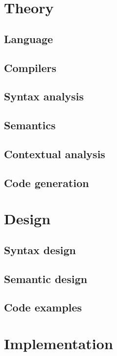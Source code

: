 \renewcommand{\ind}[1]{}
\chapter{Theory}
	\section{Language}
	\ind{sprogParadigmer}
	\section{Compilers}
	
	\section{Syntax analysis}
	\ind{grammartypes}
	\ind{grammar}
	\ind{AboutLexer}
	\section{Semantics}
	\section{Contextual analysis}
	\section{Code generation}

\renewcommand{\ind}[1]{}
\chapter{Design}
	\section{Syntax design}
	\ind{grammarchoice}
	\ind{BNF3}
	\ind{TokenSpecification}
	\section{Semantic design}
	\ind{semantics}
	\ind{TypeRules}
	\section{Code examples}

\renewcommand{\ind}[1]{}
\chapter{Implementation}
	\ind{KnownLexersAndParsers}
